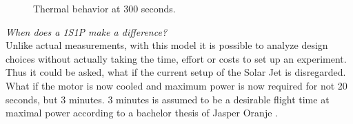 \begin{figure}[H]
  \centering
  \hfill
  \caption{Thermal behavior at 300 seconds.}
  \label{Fig:1_thermal_behavior}
\end{figure}

\textit{When does a 1S1P make a difference?}\\
Unlike actual measurements, with this model it is possible to analyze design choices without actually taking the time, effort or costs to set up an experiment. Thus it could be asked, what if the current setup of the Solar Jet is disregarded. What if the motor is now cooled and maximum power is now required for not 20 seconds, but 3 minutes. 3 minutes is assumed to be a desirable flight time at maximal power according to a bachelor thesis of Jasper Oranje \cite{BEP_Jasper}. 

